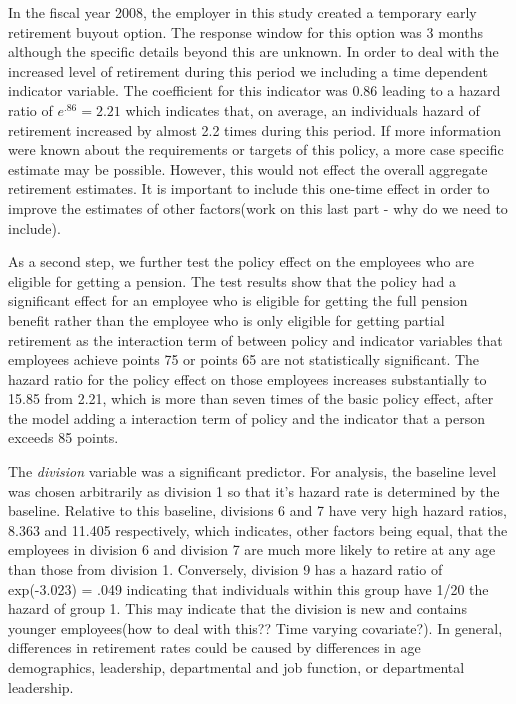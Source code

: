 \documentclass[12pt,letterpaper]{article}
\begin{document}
In the fiscal year 2008, the employer in this study created a temporary early retirement buyout option. The response window for this option was 3 months although the specific details beyond this are unknown. In order to deal with the increased level of retirement during this period we including a time dependent indicator variable.  The coefficient for this indicator was 0.86 leading to a hazard ratio of $e^{.86} = 2.21$ which indicates that, on average, an individuals hazard of retirement increased by almost 2.2 times during this period.  If more information were known about the requirements or targets of this policy, a more case specific estimate may be possible.  However, this would not effect the overall aggregate retirement estimates.  It is important to include this one-time effect in order to improve the estimates of other factors(work on this last part - why do we need to include). 

As a second step, we further test the policy effect on the employees who are eligible for getting a pension. The test results show that the policy had a significant effect for an employee who is eligible for getting the full pension benefit rather than the employee who is only eligible for getting partial retirement as the interaction term of between policy and indicator variables that employees achieve points 75 or points 65 are not statistically significant. The hazard ratio for the policy effect on those employees increases substantially to 15.85 from 2.21, which is more than seven times of the basic policy effect, after the model adding a interaction term of policy and the indicator that a person  exceeds 85 points.


The {\it division} variable was a significant predictor.  For analysis, the baseline level was chosen arbitrarily as division 1 so that it's hazard rate is determined by the baseline.  Relative to this baseline, divisions 6 and 7 have very high hazard ratios, 8.363 and 11.405 respectively, which indicates, other factors being equal, that the employees in division 6 and division 7 are much more likely to retire at any age than those from division 1.  Conversely, division 9 has a hazard ratio of exp(-3.023) = .049 indicating that individuals within this group have 1/20 the hazard of group 1.  This may indicate that the division is new and contains younger employees(how to deal with this??  Time varying covariate?).  In general, differences in retirement rates could be caused by differences in age demographics, leadership, departmental and job function, or departmental leadership.
\end{document}
